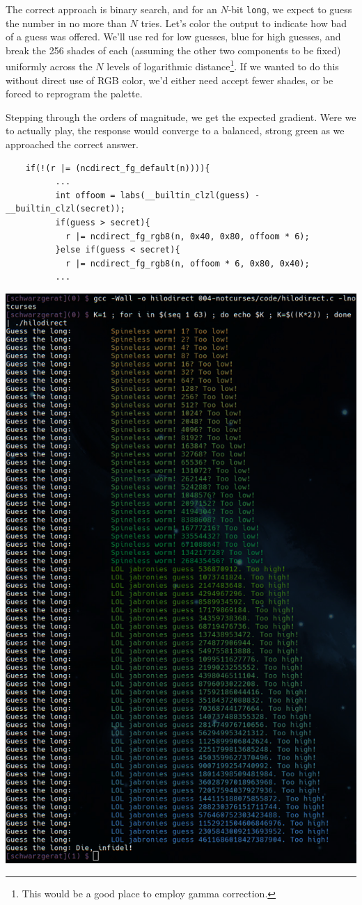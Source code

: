 \documentclass[letterpaper,10pt]{article}
\begin{document}
\begin{listing}[ht]
\inputminted[fontsize=\scriptsize]{C}{code/hilostdio.c}
\end{listing}

The correct approach is binary search, and for an $N$-bit \texttt{long}, we expect to
guess the number in no more than $N$ tries. Let's color the output to indicate how
bad of a guess was offered. We'll use red for low guesses, blue for high
guesses, and break the 256 shades of each (assuming the other two components
to be fixed) uniformly across the $N$ levels of logarithmic
distance\footnote{This would be a good place to employ \gls{gamma correction}.}.
If we wanted to do this without direct use of RGB color, we'd either need
accept fewer shades, or be forced to reprogram the palette.

Stepping through the orders of magnitude, we get the expected gradient. Were
we to actually play, the response would converge to a balanced, strong green
as we approached the correct answer.

\begin{listing}[ht]
\begin{verbatim}
    if(!(r |= (ncdirect_fg_default(n)))){
          ...
          int offoom = labs(__builtin_clzl(guess) - __builtin_clzl(secret));
          if(guess > secret){
            r |= ncdirect_fg_rgb8(n, 0x40, 0x80, offoom * 6);
          }else if(guess < secret){
            r |= ncdirect_fg_rgb8(n, offoom * 6, 0x80, 0x40);
          ...
\end{verbatim}
\end{listing}

\begin{center}
\includegraphics[width=.75\linewidth]{media/hilodirect.png}
\end{center}
\newpage
\end{document}
